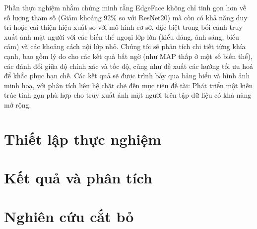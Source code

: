 Phần thực nghiệm nhằm chứng minh rằng EdgeFace không chỉ tinh gọn hơn về số lượng tham số (Giảm khoảng 92\% so với ResNet20) mà còn có khả năng duy trì hoặc cải thiện hiệu xuất so với mô hình cơ sở, đặc biệt trong bối cảnh truy xuất ảnh mặt người với các biến thể ngoại lớp lớn (kiểu dáng, ánh   sáng, biểu cảm) và các khoảng cách nội lớp nhỏ. Chúng tôi sẽ phân tích chi tiết từng khía cạnh, bao gồm lý do cho các kết quả bất ngờ (như MAP thấp ở một số biến thể), các đánh đổi giữa độ chính xác và tốc độ, cũng như đề xuất các hướng tối ưu hoá để khắc phục hạn chế. Các kết quả sẽ được trình bày qua bảng biểu và hình ảnh minh hoạ, với phân tích liên hệ chặt chẽ đến mục tiêu đề tài: Phát triển một kiến trúc tinh gọn phù hợp cho truy xuất ảnh mặt người trên tập dữ liệu có khả năng mở rộng.

\section {Thiết lập thực nghiệm}

\section {Kết quả và phân tích}

\section {Nghiên cứu cắt bỏ}